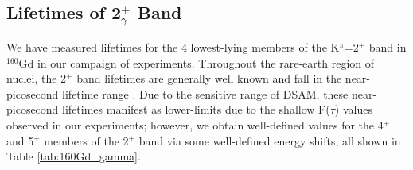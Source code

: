 \subsection{Lifetimes of 2$^+_\gamma$ Band}
We have measured lifetimes for the 4 lowest-lying members of the K$^\pi$=2$^+$ band in $^{160}$Gd in our campaign of experiments. Throughout the rare-earth region of nuclei, the 2$^+$ band lifetimes are generally well known and fall in the near-picosecond lifetime range \cite{McGowan_BE2_1981,Burke_hexadecapole1994,PhysRevC.54.679,JAMMARI_1988}. Due to the sensitive range of DSAM, these near-picosecond lifetimes manifest as lower-limits due to the shallow F($\tau$) values observed in our experiments; however, we obtain well-defined values for the 4$^+$ and 5$^+$ members of the 2$^+$ band via some well-defined energy shifts, all shown in Table \ref{tab:160Gd_gamma}.

